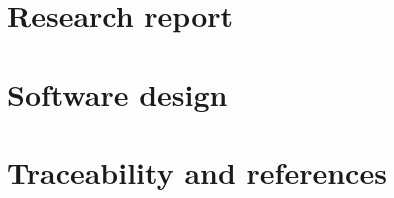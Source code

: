 \documentclass[11pt,a4paper]{article}
\begin{document}


\clearpage\part{Research report}




\clearpage\part{Software design}

\clearpage\part{Traceability and references}

\end{document}
